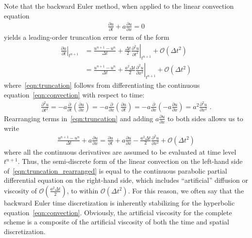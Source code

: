 Note that the backward Euler method, when applied to the linear convection equation
\begin{align}
  \label{eqn:convection}
  \frac{\partial u}{\partial t} + a \frac{\partial u}{\partial x} = 0
\end{align}
yields a leading-order truncation error term of the form
\begin{align}
  \nonumber
  \left. \frac{\partial u}{\partial t} \right|_{t^{n+1}}  &=
  \frac{u^{n+1} - u^n}{\Delta t} + \frac{\Delta t}{2}\left.\frac{\partial^2 u}{\partial t^2}\right|_{t^{n+1}} + \mathcal{O}(\Delta t^2)
  \\
  \label{eqn:truncation}
  &= \frac{u^{n+1} - u^n}{\Delta t} + \frac{a^2 \Delta t}{2}\left.\frac{\partial^2 u}{\partial x^2}\right|_{t^{n+1}} + \mathcal{O}(\Delta t^2)
\end{align}
where~\eqref{eqn:truncation} follows from differentiating the
continuous equation~\eqref{eqn:convection} with respect to time:
\begin{align}
  \label{eqn:second_wave}
  \frac{\partial^2 u}{\partial t^2} = -a \frac{\partial }{\partial t} \left( \frac{\partial u}{\partial x} \right)
  = -a \frac{\partial }{\partial x} \left( \frac{\partial u}{\partial t} \right)
  = -a \frac{\partial }{\partial x} \left( -a \frac{\partial u}{\partial x} \right)
  = a^2 \frac{\partial^2 u}{\partial x^2} \,\,.
\end{align}
Rearranging terms in~\eqref{eqn:truncation} and adding $a\frac{\partial u}{\partial x}$ to both sides allows us to write
\begin{align}
  \label{eqn:truncation_rearranged}
    \frac{u^{n+1} - u^n}{\Delta t}
    + a \frac{\partial u}{\partial x}
    =
    \frac{\partial u}{\partial t}
    + a \frac{\partial u}{\partial x}
    - \frac{a^2 \Delta t}{2} \frac{\partial^2 u}{\partial x^2}
    + \mathcal{O}(\Delta t^2)
\end{align}
where all the continuous derivatives are assumed to be evaluated at
time level $t^{n+1}$.  Thus, the semi-discrete form of the linear convection on
the left-hand side of~\eqref{eqn:truncation_rearranged} is equal to
the continuous parabolic partial differential equation on the
right-hand side, which includes ``artificial'' diffusion or viscosity of
$\mathcal{O}(\frac{a^2 \Delta t}{2})$, to within $\mathcal{O}(\Delta
t^2)$.
For this reason, we often say that the backward Euler time
discretization is inherently stabilizing for the hyperbolic
equation~\eqref{eqn:convection}.  Obviously, the artificial viscosity for the
complete scheme is a composite of the artificial viscosity of both the time
and spatial discretization. 

